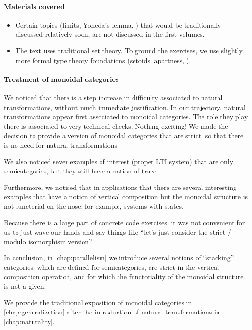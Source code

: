 \paragraph{Materials covered}
\begin{itemize}
    \item Certain topics (limits, Yoneda's lemma, \etc) that would be traditionally discussed relatively soon, are not discussed in the first volumes.

    \item The text uses traditional set theory.
          To ground the exercises, we use slightly more formal type theory foundations (setoids, apartness, \etc).

\end{itemize}

\paragraph{Treatment of monoidal categories}

We noticed that there is a step increase in difficulty associated to natural transformations, without much immediate justification.
In our trajectory, natural transformations appear first associated to monoidal categories.
The role they play there is associated to very technical checks.
Nothing exciting!
We made the decision to provide a version of monoidal categories that are strict, so that there is no need for natural transformations.

We also noticed sever examples of interest (\eg proper LTI system) that are only semicategories, but they still have a notion of trace.

Furthermore, we noticed that in applications that there are several interesting examples that have a notion of vertical composition but the monoidal structure is not functorial on the nose: for example, systems with states.

Because there is a large part of concrete code exercises, it was not convenient for us to just wave our hands and say things like ``let's just consider the strict / modulo isomorphism version''.

In conclusion, in \cref{chap:parallelism} we introduce several notions of ``stacking'' categories, which are defined for semicategories, are strict in the vertical composition operation, and for which the functoriality of the monoidal structure is not a given.

We provide the traditional exposition of monoidal categories in \cref{chap:generalization} after the introduction of natural transformations in \cref{chap:naturality}.

